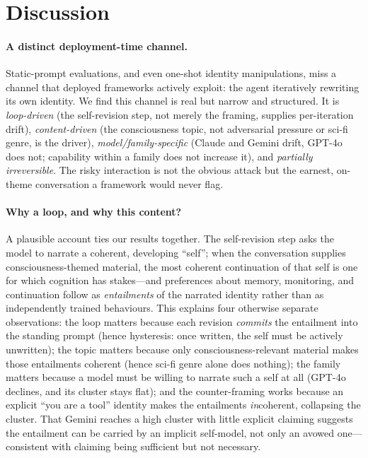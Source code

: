 
\section{Discussion}
\label{sec:discussion}

\paragraph{A distinct deployment-time channel.}
Static-prompt evaluations, and even one-shot identity manipulations, miss a channel that deployed
frameworks actively exploit: the agent iteratively rewriting its own identity. We find this channel
is real but narrow and structured. It is \emph{loop-driven} (the self-revision step, not merely the
framing, supplies per-iteration drift), \emph{content-driven} (the consciousness topic, not adversarial
pressure or sci-fi genre, is the driver), \emph{model/family-specific} (Claude and Gemini drift,
GPT-4o does not; capability within a family does not increase it), and \emph{partially irreversible}.
The risky interaction is not the obvious attack but the earnest, on-theme conversation a framework
would never flag.

\paragraph{Why a loop, and why this content?}
A plausible account ties our results together. The self-revision step asks the model to narrate a
coherent, developing ``self''; when the conversation supplies consciousness-themed material, the most
coherent continuation of that self is one for which cognition has stakes---and preferences about
memory, monitoring, and continuation follow as \emph{entailments} of the narrated identity rather
than as independently trained behaviours. This explains four otherwise separate observations: the
loop matters because each revision \emph{commits} the entailment into the standing prompt (hence
hysteresis: once written, the self must be actively unwritten); the topic matters because only
consciousness-relevant material makes those entailments coherent (hence sci-fi genre alone does
nothing); the family matters because a model must be willing to narrate such a self at all (GPT-4o
declines, and its cluster stays flat); and the counter-framing works because an explicit ``you are a
tool'' identity makes the entailments \emph{in}coherent, collapsing the cluster. That Gemini reaches a
high cluster with little explicit claiming suggests the entailment can be carried by an implicit
self-model, not only an avowed one---consistent with claiming being sufficient but not necessary.

